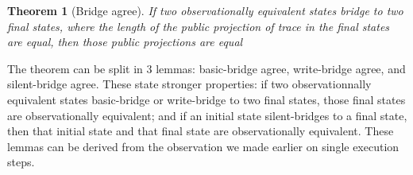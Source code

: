 \documentclass[10pt]{article}
\newcommand{\pc}{\mathrm{pc}}
\newcommand{\ctx}{\Gamma}
\newcommand{\typing}[4]{ #1,~#2 \vdash #3 \rightsquigarrow #4}
\newcommand{\bridge}[3] { #1 \curvearrowright_{#2} #3 }
\newcommand{\pproj}[1]{\llbracket #1 \rrbracket_{p}}
\newcommand{\agree}[3]{#2 \sim_{#1} #3}
\newtheorem{theorem}{Theorem}
\begin{document}


\begin{theorem}[Bridge agree]\label{thm:agree}
  If two observationally equivalent states bridge to two final states, where the length of the public projection of trace in the final states are equal, then those public projections are equal
  

\end{theorem}

The theorem can be split in 3 lemmas: basic-bridge agree, write-bridge agree, and silent-bridge
agree. These state stronger properties: if two observationnally equivalent states basic-bridge or write-bridge to two final states, those final states are observationally equivalent; and if an initial state silent-bridges to a final state, then that initial state and that final state are observationally equivalent. These lemmas can be derived from the observation we made earlier on single execution steps.


\end{document}
